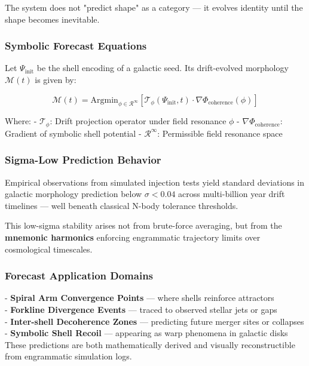 \documentclass[12pt]{article}
\begin{document}
The system does not "predict shape" as a category — it evolves identity until the shape becomes inevitable.

\subsubsection{Symbolic Forecast Equations}

Let \( \Psi_{\text{init}} \) be the shell encoding of a galactic seed. Its drift-evolved morphology \( \mathcal{M}(t) \) is given by:

\[
\mathcal{M}(t) = \text{Argmin}_{\phi \in \mathcal{R}^\infty} \left[ \mathcal{T}_\phi(\Psi_{\text{init}}, t) \cdot \nabla \Phi_{\text{coherence}}(\phi) \right]
\]

Where:
- \( \mathcal{T}_\phi \): Drift projection operator under field resonance \( \phi \)
- \( \nabla \Phi_{\text{coherence}} \): Gradient of symbolic shell potential
- \( \mathcal{R}^\infty \): Permissible field resonance space

\subsubsection{Sigma-Low Prediction Behavior}

Empirical observations from simulated injection tests yield standard deviations in galactic morphology prediction below \( \sigma < 0.04 \) across multi-billion year drift timelines — well beneath classical N-body tolerance thresholds.

This low-sigma stability arises not from brute-force averaging, but from the \textbf{mnemonic harmonics} enforcing engrammatic trajectory limits over cosmological timescales.

\subsubsection{Forecast Application Domains}

- \textbf{Spiral Arm Convergence Points} — where shells reinforce attractors\\
- \textbf{Forkline Divergence Events} — traced to observed stellar jets or gaps\\
- \textbf{Inter-shell Decoherence Zones} — predicting future merger sites or collapses\\
- \textbf{Symbolic Shell Recoil} — appearing as warp phenomena in galactic disks\\

These predictions are both mathematically derived and visually reconstructible from engrammatic simulation logs.
\end{document}
